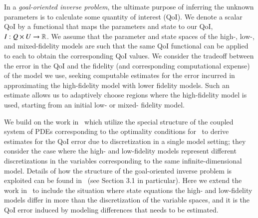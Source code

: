 In a {\em goal-oriented inverse problem}, the ultimate purpose of inferring the unknown parameters is to calculate some quantity of interest (QoI). We denote a scalar QoI by a functional that maps the parameters and state to our QoI, $I:Q \times U \to {\mathbb{R}}$. %
We assume that the parameter and state spaces of the high-, low-, and mixed-fidelity models are such that the same QoI functional can be applied to each to obtain the corresponding QoI values. 
We consider the tradeoff between the error in the QoI and the fidelity (and corresponding computational expense) of the model we use, seeking computable estimates for the error incurred in approximating the high-fidelity model with lower fidelity models. Such an estimate allows us to adaptively choose regions where the high-fidelity model is used, starting from an initial low- or mixed- fidelity model.


We build on the work in~\cite{BecVex05, becker2004posteriori} which utilize the special structure of the coupled system of PDEs corresponding to the optimality conditions for~ to derive estimates for the QoI error due to discretization in a single model setting; they consider the case where the high- and low-fidelity models represent different discretizations in the variables corresponding to the same infinite-dimensional model. Details of how the structure of the goal-oriented inverse problem is exploited can be found in~\cite{becker2004posteriori} (see Section 3.1 in particular). Here we extend the work in~\cite{BecVex05} to include the situation where state equations the high- and low-fidelity models differ in more than the discretization of the variable spaces, and it is the QoI error induced by modeling differences that needs to be estimated.

